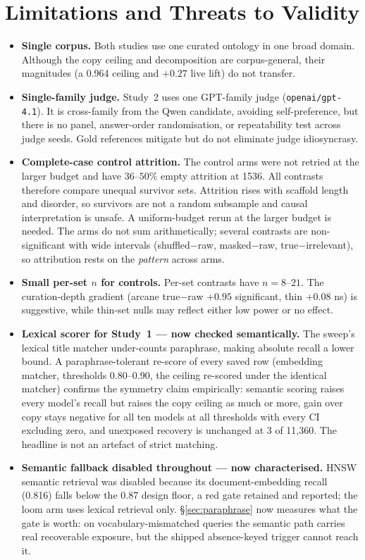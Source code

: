 \documentclass[10pt,twocolumn]{article}
\begin{document}
\section{Limitations and Threats to Validity}\label{sec:limits}
\begin{itemize}[topsep=2pt,itemsep=2pt,leftmargin=1.4em]
\item \textbf{Single corpus.} Both studies use one curated ontology in one broad domain. Although the copy ceiling and decomposition are corpus-general, their magnitudes (a 0.964 ceiling and $+0.27$ live lift) do not transfer.
\item \textbf{Single-family judge.} Study~2 uses one GPT-family judge
(\texttt{openai/gpt-4.1}). It is cross-family from the Qwen candidate, avoiding self-preference, but there is no panel, answer-order randomisation, or repeatability test across judge seeds. Gold references mitigate but do not eliminate judge idiosyncrasy.
\item \textbf{Complete-case control attrition.} The control arms were not retried at the larger budget and have $36$--$50\%$ empty attrition at 1536. All contrasts therefore compare unequal survivor sets. Attrition rises with scaffold length and disorder, so survivors are not a random subsample and causal interpretation is unsafe. A uniform-budget rerun at the larger budget is needed. The arms do not sum arithmetically; several contrasts are non-significant with wide intervals (shuffled$-$raw, masked$-$raw, true$-$irrelevant), so attribution rests on the \emph{pattern} across arms.
\item \textbf{Small per-set $n$ for controls.} Per-set contrasts have $n=8$--$21$. The curation-depth gradient (arcane true$-$raw $+0.95$ significant, thin $+0.08$ ns) is suggestive, while thin-set nulls may reflect either low power or no effect.
\item \textbf{Lexical scorer for Study~1 --- now checked semantically.} The sweep's lexical
title matcher under-counts paraphrase, making absolute recall a lower bound. A
paraphrase-tolerant re-score of every saved row (embedding matcher, thresholds 0.80--0.90, the
ceiling re-scored under the identical matcher) confirms the symmetry claim empirically:
semantic scoring raises every model's recall but raises the copy ceiling as much or more, gain
over copy stays negative for all ten models at all thresholds with every CI excluding zero, and
unexposed recovery is unchanged at 3 of 11{,}360. The headline is not an artefact of strict
matching.
\item \textbf{Semantic fallback disabled throughout --- now characterised.} HNSW semantic retrieval was disabled because its document-embedding recall (0.816) falls below the 0.87 design floor, a red gate retained and reported; the loom arm uses lexical retrieval only. \S\ref{sec:paraphrase} now measures what the gate is worth: on vocabulary-mismatched queries the semantic path carries real recoverable exposure, but the shipped absence-keyed trigger cannot reach it.

\end{itemize}
\end{document}
